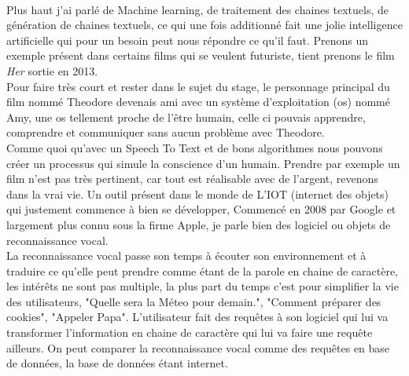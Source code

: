 \sepline\\
Plus haut j'ai parlé de Machine learning, de traitement des chaines textuels, de génération de chaines textuels, ce qui une fois additionné fait une jolie intelligence artificielle qui pour un besoin peut nous répondre ce qu'il faut. Prenons un exemple présent dans certains films qui se veulent futuriste, tient prenons le film \textit{Her} sortie en 2013.\\
\linebreak
Pour faire très court et rester dans le sujet du stage, le personnage principal du film nommé Theodore devenais ami avec un système d'exploitation (os) nommé Amy, une os tellement proche de l'être humain, celle ci pouvais apprendre, comprendre et communiquer sans aucun problème avec Theodore.\\
Comme quoi qu'avec un Speech To Text et de bons algorithmes nous pouvons créer un processus qui simule la conscience d'un humain. Prendre par exemple un film n'est pas très pertinent, car tout est réalisable avec de l'argent, revenons dans la vrai vie. Un outil présent dans le monde de L'IOT (internet des objets) qui justement commence à bien se développer, Commencé en 2008 par Google et largement plus connu sous la firme Apple, je parle bien des logiciel ou objets de reconnaissance vocal.\\
\linebreak
La reconnaissance vocal passe son temps à écouter son environnement et à traduire ce qu'elle peut prendre comme étant de la parole en chaine de caractère, les intérêts ne sont pas multiple, la plus part du temps c'est pour simplifier la vie des utilisateurs, "Quelle sera la Méteo pour demain.", "Comment préparer des cookies", "Appeler Papa". L'utilisateur fait des requêtes à son logiciel qui lui va transformer l'information en chaine de caractère qui lui va faire une requête ailleurs. On peut comparer la reconnaissance vocal comme des requêtes en base de données, la base de données étant internet. 